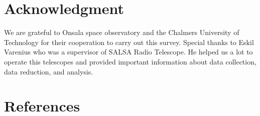 \documentclass[conference]{IEEEtran}
\begin{document}
\section*{Acknowledgment}

We are grateful to Onsala space observatory and the Chalmers University of Technology for their cooperation to carry out this survey. Special thanks to Eskil Varenius who was a supervisor of SALSA Radio Telescope. He helped us a lot to operate this telescopes and provided important information about data collection, data reduction, and analysis.

\section*{References}





\end{document}
